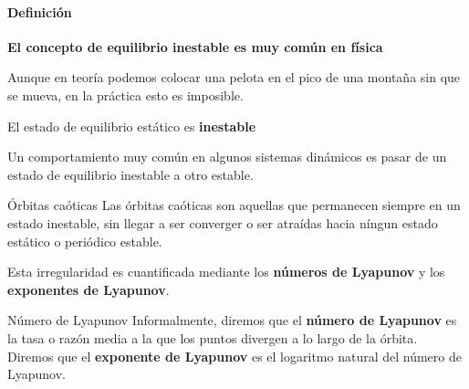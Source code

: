 \documentclass[8pt]{beamer}
\begin{document}
\begin{frame}
\framesubtitle{Definición}
\textbf{El concepto de equilibrio inestable es muy común en física}

\begin{example}
Aunque en teoría podemos colocar una pelota en el pico de una montaña sin que se mueva, en la práctica esto es imposible.

El estado de equilibrio estático es \textbf{inestable}
\end{example}

Un comportamiento muy común en algunos sistemas dinámicos es pasar de un estado de equilibrio inestable a otro estable.

\begin{block}{Órbitas caóticas}
Las órbitas caóticas son aquellas que permanecen siempre en un estado inestable, sin llegar a ser converger o ser atraídas hacia níngun estado estático o periódico estable.

Esta irregularidad es cuantificada mediante los \textbf{números de Lyapunov} y los \textbf{exponentes de Lyapunov}.
\end{block}

\begin{block}{Número de Lyapunov}
Informalmente, diremos que el \textbf{número de Lyapunov} es la tasa o razón media a la que los puntos divergen a lo largo de la órbita. Diremos que el \textbf{exponente de Lyapunov} es el logaritmo natural del número de Lyapunov.
\end{block}

\end{frame}
\end{document}

